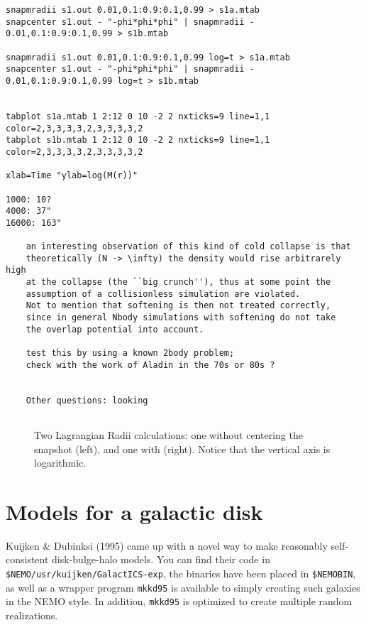 \footnotesize\begin{verbatim}
snapmradii s1.out 0.01,0.1:0.9:0.1,0.99 > s1a.mtab
snapcenter s1.out - "-phi*phi*phi" | snapmradii - 0.01,0.1:0.9:0.1,0.99 > s1b.mtab

snapmradii s1.out 0.01,0.1:0.9:0.1,0.99 log=t > s1a.mtab
snapcenter s1.out - "-phi*phi*phi" | snapmradii - 0.01,0.1:0.9:0.1,0.99 log=t > s1b.mtab


tabplot s1a.mtab 1 2:12 0 10 -2 2 nxticks=9 line=1,1 color=2,3,3,3,3,2,3,3,3,3,2
tabplot s1b.mtab 1 2:12 0 10 -2 2 nxticks=9 line=1,1 color=2,3,3,3,3,2,3,3,3,3,2

xlab=Time "ylab=log(M(r))"

1000: 10?
4000: 37"
16000: 163"

    an interesting observation of this kind of cold collapse is that
    theoretically (N -> \infty) the density would rise arbitrarely high
    at the collapse (the ``big crunch''), thus at some point the
    assumption of a collisionless simulation are violated.
    Not to mention that softening is then not treated correctly,
    since in general Nbody simulations with softening do not take
    the overlap potential into account.

    test this by using a known 2body problem; 
    check with the work of Aladin in the 70s or 80s ?


    Other questions: looking


\end{verbatim}\normalsize

\begin{figure}[htb]
\caption{Two Lagrangian Radii calculations: one without centering the
snapshot (left), and one with (right). Notice that the vertical axis is
logarithmic.}
\end{figure}




\section{Models for a galactic disk}

Kuijken \& Dubinksi (1995) came up with a novel way to make reasonably
self-consistent disk-bulge-halo models. You can find
their code in {\tt \$NEMO/usr/kuijken/GalactICS-exp}, the binaries have
been placed in {\tt \$NEMOBIN}, as well as a wrapper program
{\tt mkkd95} is available to simply creating such galaxies in the
NEMO style. In addition, {\tt mkkd95} is optimized to create
multiple random realizations.

